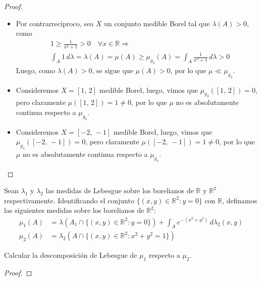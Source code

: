 \documentclass[12pt]{article}
\newenvironment{statement}[2][Ejercicio]{\begin{trivlist}
\item[\hskip \labelsep {\bfseries #1}\hskip \labelsep {\bfseries #2.}]}{\end{trivlist}}
\begin{document}
\begin{proof}
\begin{itemize}
\begin{itemize}
                  \item[(ii)] Por contrarrecíproco, sea $X$ un conjunto medible Borel tal que $\lambda(A) > 0$, como \begin{align*}
                        & 1 \geq \frac{1}{x^2 + 1} > 0 \quad \forall x \in \mathbb{R} \Rightarrow \\
                        & \int_A 1 \, d\lambda = \lambda(A) = \mu(A) \geq \mu_{g_2}(A) = \int_A \frac{1}{x^2 + 1} \, d\lambda > 0 
                  \end{align*}
                  Luego, como $\lambda(A) > 0$, se sigue que $\mu(A) > 0$, por lo que $\mu \ll \mu_{g_2}$.
                  \item[(iii)] Consideremos $X = [1\text{, }2]$ medible Borel, luego, vimos que $\mu_{g_3}([1\text{, }2]) = 0$, pero claramente $\mu([1\text{, }2]) = 1 \neq 0$, por lo que $\mu$ no es absolutamente continua respecto a $\mu_{g_3}$.
                  \item[(iv)] Consideremos $X = [-2\text{, }-1]$ medible Borel, luego, vimos que $\mu_{g_4}([-2\text{, }-1]) = 0$, pero claramente $\mu([-2\text{, }-1]) = 1 \neq 0$, por lo que $\mu$ no es absolutamente continua respecto a $\mu_{g_4}$.
              \end{itemize}
    \end{itemize}
\end{proof}

\begin{statement}{11}
    Sean $\lambda_1$ y $\lambda_2$ las medidas de Lebesgue sobre los borelianos de $\mathbb{R}$ y $\mathbb{R}^2$ respectivamente. Identificando el conjunto $\{(x, y) \in \mathbb{R}^2 : y = 0\}$ con $\mathbb{R}$, definamos las siguientes medidas sobre los borelianos de $\mathbb{R}^2$:
    \begin{align*}
        \mu_1(A) & = \lambda(A_1 \cap \{(x, y) \in \mathbb{R}^2 : y = 0\}) + \int_A e^{-(x^2 + y^2)} \, d\lambda_2(x, y) \\
        \mu_2(A) & = \lambda_2(A \cap \{(x, y) \in \mathbb{R}^2 : x^2 + y^2 = 1\})
    \end{align*}

    Calcular la descomposición de Lebesgue de $\mu_1$ respecto a $\mu_2$.
\end{statement}

\begin{proof}

\end{proof}
\end{document}
